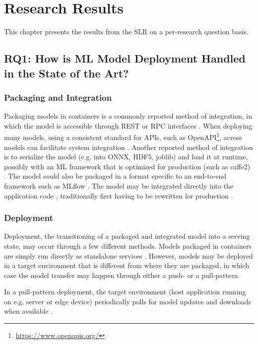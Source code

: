 \chapter{Research Results}
\label{ch:research_results}
This chapter presents the results from the SLR on a per-research question basis.

\section{RQ1: How is ML Model Deployment Handled in the State of the Art?}
\subsection{Packaging and Integration}
Packaging models in containers is a commonly reported method of integration, in which the model is accessible through REST or RPC interfaces \cite{Garcia2020, Li2017, Ruf2021, Crankshaw2017}.
When deploying many models, using a consistent standard for APIs, such as OpenAPI\footnote{\url{https://www.openapis.org/}}, across models can facilitate system integration \cite{Garcia2020}.
Another reported method of integration is to serialize the model (e.g. into ONNX, HDF5, joblib) and load it at runtime, possibly with an ML framework that is optimized for production (such as caffe2) \cite{Hazelwood2018, Peticolas2019, Paeaekkoenen2020, Chahal2020}.
The model could also be packaged in a format specific to an end-to-end framework such as MLflow \cite{Chen2020}.
The model may be integrated directly into the application code \cite{Liu2020, Ruf2021, Granlund2021}, traditionally first having to be rewritten for production \cite{Hazelwood2018}.

\subsection{Deployment}
Deployment, the transitioning of a  packaged and integrated model into a serving state, may occur through a few different methods.
Models packaged in containers are simply run directly as standalone services \cite{Liu2020,Ruf2021, Granlund2021, Li2017, Garcia2020}.
However, models may be deployed in a target environment that is different from where they are packaged, in which case the model transfer may happen through either a push- or a pull-pattern.

In a pull-pattern deployment, the target environment (host application running on e.g. server or edge device) periodically polls for model updates and downloads when available \cite{Paeaekkoenen2020, Li2017, Peticolas2019}.

